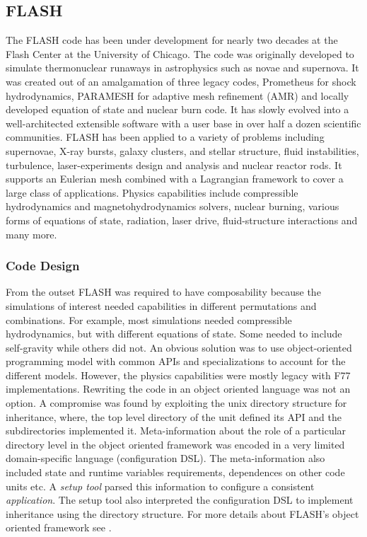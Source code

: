 \subsection{FLASH}
The FLASH code \cite{FLASH,Dubey2009}  has been under development for nearly two decades at the
Flash Center at the University of Chicago. The code was originally
developed to simulate thermonuclear runaways in astrophysics such as
novae and supernova. It was created out of an amalgamation of three
legacy codes, Prometheus for 
shock hydrodynamics, PARAMESH for adaptive mesh refinement (AMR) and
locally developed equation of state and nuclear burn code. It has
slowly evolved into a well-architected extensible software with a user
base in over half a dozen scientific communities. FLASH has been
applied to a variety of problems including supernovae, X-ray bursts,
galaxy clusters, and stellar structure, fluid instabilities,
turbulence, laser-experiments design and analysis and nuclear reactor
rods. It supports an Eulerian mesh combined with a Lagrangian
framework to cover a large class of applications. Physics capabilities
include compressible hydrodynamics and magnetohydrodynamics solvers,
nuclear burning, various forms of equations of state, radiation, laser
drive, fluid-structure interactions and many more.   

\subsubsection{Code Design}
\label{sec:FLASHdesign}

From the outset FLASH was required to have composability because the
simulations of interest needed capabilities in different permutations
and combinations. For example, most simulations needed compressible
hydrodynamics, but with different equations of state. Some needed to
include self-gravity while others did not. An 
obvious solution was to use object-oriented programming model with
common APIs and specializations to account for the different
models. However, the physics capabilities were mostly legacy with F77
implementations. Rewriting the code in an object oriented language was
not an option. A compromise was found by exploiting the unix directory
structure for inheritance, where, the top level directory of the unit
defined its API and the subdirectories implemented it.
Meta-information 
about the role of a particular directory level in the object oriented framework
was encoded in a very limited domain-specific language (configuration
DSL). The meta-information also included state and runtime variables
requirements, dependences on other code units etc. A {\em setup tool}
parsed this information to configure a consistent {\em application}. The
setup tool also interpreted the configuration DSL to implement 
inheritance using the directory structure. For more details about
FLASH's object oriented framework see \cite{Dubey2009}.   

